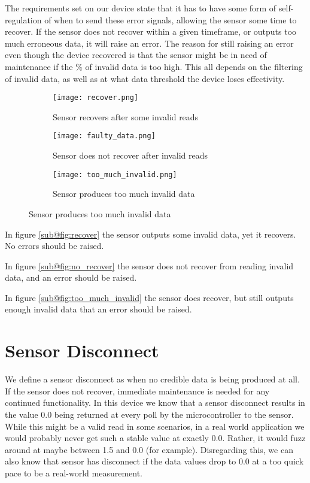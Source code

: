The requirements set on our device state that it has to have some form of self-regulation of when to send these error signals, allowing the sensor some time to recover. If the sensor does not recover within a given timeframe, or outputs too much erroneous data, it will raise an error. The reason for still raising an error even though the device recovered is that the sensor might be in need of maintenance if the \% of invalid data is too high. This all depends on the filtering of invalid data, as well as at what data threshold the device loses effectivity.

\begin{figure}[H]
\centering
	\begin{subfigure}[b]{0.3\textwidth}
    \texttt{[image: recover.png]}
    \caption{Sensor recovers after some invalid reads}
    \label{fig:recover}
	\end{subfigure}
	\begin{subfigure}[b]{0.3\textwidth}
    \texttt{[image: faulty\_data.png]}
    \caption{Sensor does not recover after invalid reads}
    \label{fig:no_recover}
	\end{subfigure}
	\begin{subfigure}[b]{0.3\textwidth}
    \texttt{[image: too\_much\_invalid.png]}
    \caption{Sensor produces too much invalid data}
    \label{fig:too_much_invalid}
	\end{subfigure}
\end{figure}
In figure \ref{sub@fig:recover} the sensor outputs some invalid data, yet it recovers. No errors should be raised.

In figure \ref{sub@fig:no_recover} the sensor does not recover from reading invalid data, and an error should be raised.

In figure \ref{sub@fig:too_much_invalid} the sensor does recover, but still outputs enough invalid data that an error should be raised. 


\section{Sensor Disconnect}
We define a sensor disconnect as when no credible data is being produced at all. If the sensor does not recover, immediate maintenance is needed for any continued functionality. In this device we know that a sensor disconnect results in the value 0.0 being returned at every poll by the microcontroller to the sensor. While this might be a valid read in some scenarios, in a real world application we would probably never get such a stable value at exactly 0.0. Rather, it would fuzz around at maybe between 1.5 and 0.0 (for example). Disregarding this, we can also know that sensor has disconnect if the data values drop to 0.0 at a too quick pace to be a real-world measurement. 

